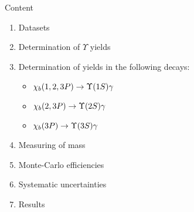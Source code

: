 \begin{frame}{Content}
\begin{enumerate}
\item Datasets
\item Determination of $\Upsilon$ yields
\item Determination of \chib yields in the following decays:
\begin{itemize}
    \item $\chi_b(1,2,3P) \to \OneS \gamma$
    \item $\chi_b(2,3P) \to \TwoS \gamma$
    \item $\chi_b(3P) \to \ThreeS \gamma$
\end{itemize}
\item Measuring of \chiboneThreeP mass
\item Monte-Carlo efficiencies
\item Systematic uncertainties 
\item Results
\end{enumerate}
\end{frame}
